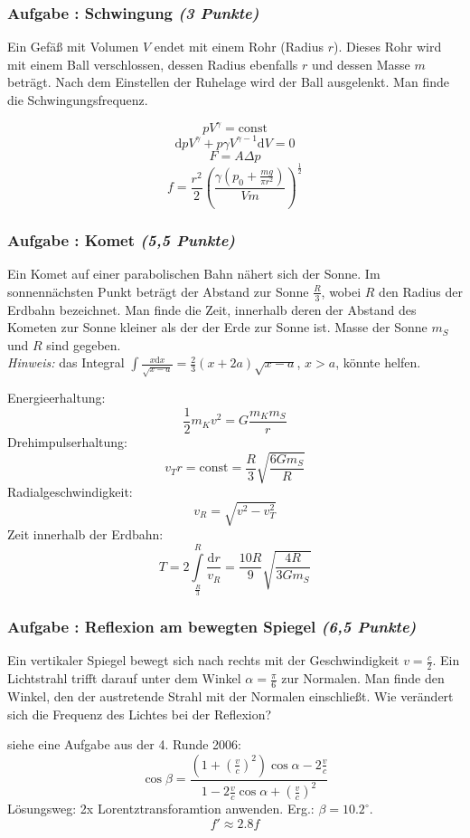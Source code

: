 \documentclass[12pt,a4paper]{article}
\newcommand{\dif}{\mathrm{d}}
\newcommand{\hinweis}{\emph{Hinweis:} }
\newcounter{numlabel}
\newenvironment{problem}[2]{\stepcounter{numlabel} \vspace{1ex} \subsubsection*{Aufgabe \the\value{numlabel}: #1 \emph{(#2 Punkte)}} \renewcommand{\Currentlabel}{Aufgabe \the\value{numlabel}: #1}}{

}
\begin{document}
\begin{problem}{Schwingung}{3}
Ein Gefäß mit Volumen $V$ endet mit einem Rohr (Radius $r$). Dieses Rohr wird mit einem Ball verschlossen, dessen Radius ebenfalls $r$ und dessen Masse $m$ beträgt. Nach dem Einstellen der Ruhelage wird der Ball ausgelenkt. Man finde die Schwingungsfrequenz.
\begin{solution}
\[
pV^\gamma =\mathrm{const}
\]
\[
\dif p V^\gamma + p \gamma V^{\gamma-1} \dif V=0
\]
\[
F=A \Delta p
\]
\[
f=\frac{r^2}{2}\left( \frac{\gamma (p_0+\frac{mg}{\pi r^2})}{Vm} \right)^{\frac 12}
\]
\end{solution}
\end{problem}

\begin{problem}{Komet}{5,5}
Ein Komet auf einer parabolischen Bahn nähert sich der Sonne. Im sonnennächsten Punkt beträgt der Abstand zur Sonne $\frac R3$, wobei $R$ den Radius der Erdbahn bezeichnet. Man finde die Zeit, innerhalb deren der Abstand des Kometen zur Sonne kleiner als der der Erde zur Sonne ist. Masse der Sonne $m_S$ und $R$ sind gegeben.\\
\hinweis das Integral $\int \frac{x \dif x}{\sqrt{x-a}}=\frac 23 (x+2a) \sqrt{x-a}$, $x>a$, könnte helfen.
\begin{solution}
Energieerhaltung:
\[
\frac 12 m_K v^2=G \frac{m_K m_S}{r}
\]
Drehimpulserhaltung:
\[
v_T r=\mathrm{const}=\frac{R}{3}\sqrt{\frac{6 G m_S}{R}}
\]
Radialgeschwindigkeit:
\[
v_R=\sqrt{v^2-v_T^2}
\]
Zeit innerhalb der Erdbahn:
\[
T=2 \int\limits_\frac R3^R \frac{\dif r}{v_R}=\frac{10 R}{9} \sqrt{\frac{4 R}{3 G m_S}}
\]
\end{solution}
\end{problem}

\begin{problem}{Reflexion am bewegten Spiegel}{6,5}
Ein vertikaler Spiegel bewegt sich nach rechts mit der Geschwindigkeit $v=\frac c2$. Ein Lichtstrahl trifft darauf unter dem Winkel $\alpha=\frac \pi 6$ zur Normalen. Man finde den Winkel, den der austretende Strahl mit der Normalen einschließt. Wie verändert sich die Frequenz des Lichtes bei der Reflexion?
\begin{solution}
siehe eine Aufgabe aus der 4. Runde 2006:
\[
\cos\beta=\frac{(1+(\frac{v}{c})^2)\cos\alpha-2\frac{v}{c}}{1-2\frac{v}{c}\cos\alpha+(\frac{v}{c})^2}
\]
Lösungsweg: 2x Lorentztransforamtion anwenden. Erg.: $\beta=10.2^\circ$.
\[
f' \approx 2.8 f
\]
\end{solution}
\end{problem}
\end{document}
